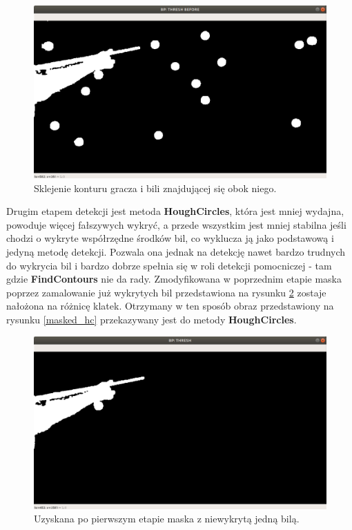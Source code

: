 \documentclass[12pt]{article}
\begin{document}
    \begin{figure}[!htb]
        \centering
        \includegraphics[width=15cm]{./images/obrazki/bp/thresh_before_hc2.png}
        \caption{Sklejenie konturu gracza i bili znajdującej się obok niego.}
        \label{thresh_before_hc}
    \end{figure}

    Drugim etapem detekcji jest metoda \textbf{HoughCircles}, która jest mniej wydajna, powoduje więcej fałszywych wykryć, a przede wszystkim jest mniej stabilna jeśli chodzi o wykryte współrzędne środków bil, co wyklucza ją jako podstawową i jedyną metodę detekcji. Pozwala ona jednak na detekcję nawet bardzo trudnych do wykrycia bil i bardzo dobrze spełnia się w roli detekcji pomocniczej - tam gdzie \textbf{FindContours} nie da rady. Zmodyfikowana w poprzednim etapie maska poprzez zamalowanie już wykrytych bil przedstawiona na rysunku \ref{thresh_hc} zostaje nałożona na różnicę klatek. Otrzymany w ten sposób obraz przedstawiony na rysunku \ref{masked_hc} przekazywany jest do metody \textbf{HoughCircles}.

    \begin{figure}[!htb]
        \centering
        \includegraphics[width=15cm]{./images/obrazki/bp/thresh_hc.png}
        \caption{Uzyskana po pierwszym etapie maska z niewykrytą jedną bilą.}
        \label{thresh_hc}
    \end{figure}
\end{document}
